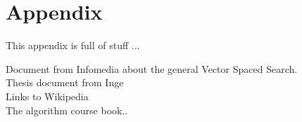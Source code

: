 \chapter{Appendix}

This appendix is full of stuff ...

Document from Infomedia about the general Vector Spaced Search.\\
Thesis document from Inge\\
Links to Wikipedia\\
The algorithm course book..